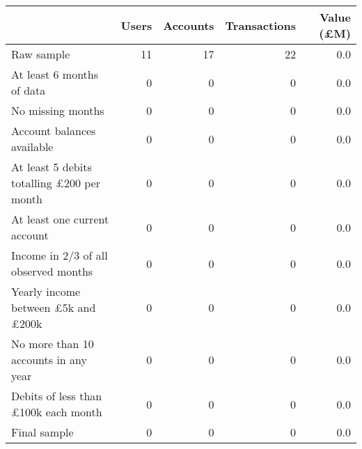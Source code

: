 \begin{tabular}{lrrrr}
\toprule
                                                 & Users & Accounts & Transactions & Value (\pounds M) \\
\midrule
                                      Raw sample &    11 &       17 &           22 &               0.0 \\
                       At least 6 months of data &     0 &        0 &            0 &               0.0 \\
                               No missing months &     0 &        0 &            0 &               0.0 \\
                      Account balances available &     0 &        0 &            0 &               0.0 \\
At least 5 debits totalling \pounds200 per month &     0 &        0 &            0 &               0.0 \\
                    At least one current account &     0 &        0 &            0 &               0.0 \\
            Income in 2/3 of all observed months &     0 &        0 &            0 &               0.0 \\
 Yearly income between \pounds5k and \pounds200k &     0 &        0 &            0 &               0.0 \\
            No more than 10 accounts in any year &     0 &        0 &            0 &               0.0 \\
      Debits of less than \pounds100k each month &     0 &        0 &            0 &               0.0 \\
                                    Final sample &     0 &        0 &            0 &               0.0 \\
\bottomrule
\end{tabular}
